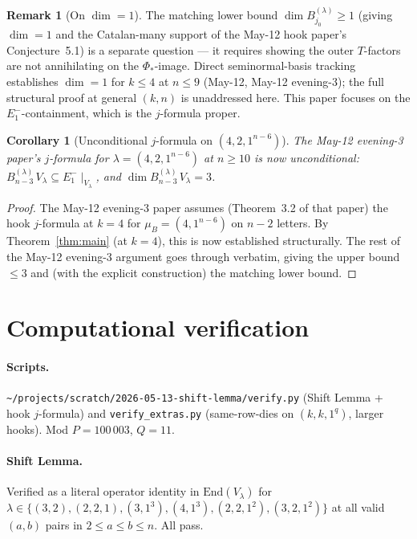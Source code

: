 \documentclass[11pt]{article}
\newtheorem{corollary}[theorem]{Corollary}
\theoremstyle{definition}
\newtheorem{remark}[theorem]{Remark}
\begin{document}
\begin{remark}[On $\dim = 1$]\label{rem:dim-1}
The matching lower bound $\dim B^{(\lambda)}_{j_0} \ge 1$ (giving
$\dim = 1$ and the Catalan-many support of the May-12 hook paper's
Conjecture~5.1) is a separate question --- it requires showing the
outer $T$-factors are not annihilating on the $\Phi_*$-image.  Direct
seminormal-basis tracking establishes $\dim = 1$ for $k \le 4$ at
$n \le 9$ (May-12, May-12 evening-3); the full structural proof at
general $(k, n)$ is unaddressed here.  This paper focuses on the
$E_1^-$-containment, which is the $j$-formula proper.
\end{remark}

\begin{corollary}[Unconditional $j$-formula on $(4, 2, 1^{n-6})$]\label{cor:421}
The May-12 evening-3 paper's $j$-formula for $\lambda = (4, 2, 1^{n-6})$
at $n \ge 10$ is now \emph{unconditional}:
$B^{(\lambda)}_{n-3}\,V_\lambda \subseteq E_1^-\!\mid_{V_\lambda}$,
and $\dim B^{(\lambda)}_{n-3}\,V_\lambda = 3$.
\end{corollary}

\begin{proof}
The May-12 evening-3 paper assumes (Theorem~3.2 of that paper) the
hook $j$-formula at $k = 4$ for $\mu_B = (4, 1^{n-6})$ on $n - 2$
letters.  By Theorem~\ref{thm:main} (at $k = 4$), this is now
established structurally.  The rest of the May-12 evening-3 argument
goes through verbatim, giving the upper bound $\le 3$ and (with the
explicit construction) the matching lower bound.
\end{proof}

\section{Computational verification}\label{sec:verification}

\paragraph{Scripts.}
\texttt{\textasciitilde/projects/scratch/2026-05-13-shift-lemma/verify.py}
(Shift Lemma + hook $j$-formula) and
\texttt{verify\_extras.py} (same-row-dies on $(k, k, 1^q)$, larger
hooks).  Mod $P = 100\,003$, $Q = 11$.

\paragraph{Shift Lemma.}  Verified as a literal operator identity in
$\mathrm{End}(V_\lambda)$ for $\lambda \in \{(3, 2), (2, 2, 1),
(3, 1^3), (4, 1^3), (2, 2, 1^2), (3, 2, 1^2)\}$ at all valid $(a, b)$
pairs in $2 \le a \le b \le n$.  All pass.
\end{document}
